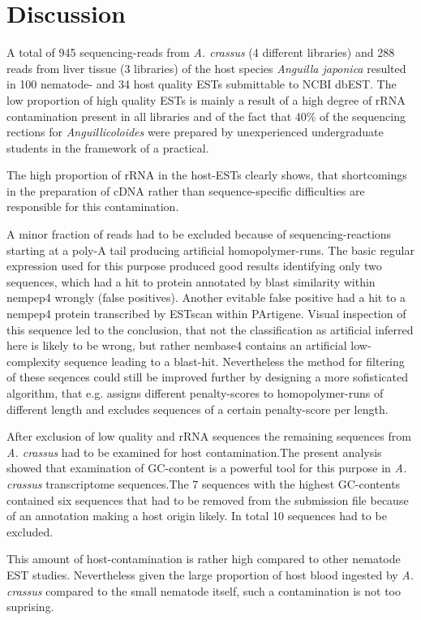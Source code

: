 \documentclass[12pt,a4paper]{article}
\begin{document}
\section*{Discussion}

A total of 945 sequencing-reads from
\textit{A. crassus} (4 different libraries) and
288 reads from liver tissue (3 libraries)
of the host species \textit{Anguilla japonica} resulted in
100 nematode- and
34 host quality ESTs submittable to NCBI
dbEST. The low proportion of high quality ESTs is mainly a result of a
high degree of rRNA contamination present in all libraries and of the
fact that 40\% of the sequencing rections for
\textit{Anguillicoloides} were prepared by unexperienced undergraduate
students in the framework of a practical.

The high proportion of rRNA in the host-ESTs clearly shows, that
shortcomings in the preparation of cDNA rather than sequence-specific
difficulties are responsible for this contamination.

A minor fraction of reads had to be excluded because of
sequencing-reactions starting at a poly-A tail producing artificial
homopolymer-runs. The basic regular expression used for this purpose
produced good results identifying only two sequences, which had a hit
to protein annotated by blast similarity within nempep4 wrongly (false
positives). Another evitable false positive had a hit to a nempep4
protein transcribed by ESTscan\cite{estscan} within PArtigene. Visual
inspection of this sequence led to the conclusion, that not the
classification as artificial inferred here is likely to be wrong, but
rather nembase4 contains an artificial low-complexity sequence leading
to a blast-hit. Nevertheless the method for filtering of these
seqences could still be improved further by designing a more
sofisticated algorithm, that e.g. assigns different penalty-scores to
homopolymer-runs of different length and excludes sequences of a
certain penalty-score per length.

After exclusion of low quality and rRNA sequences the remaining
sequences from \textit{A. crassus} had to be examined for host
contamination.The present analysis showed that examination of
GC-content is a powerful tool for this purpose in \textit{A. crassus}
transcriptome sequences.The 7 sequences with the highest GC-contents
contained six sequences that had to be removed from the submission
file because of an annotation making a host origin likely. In total 10
sequences had to be excluded.

This amount of host-contamination is rather high compared to other
nematode EST studies. Nevertheless given the large proportion of host
blood ingested by \textit{A. crassus} compared to the small nematode
itself, such a contamination is not too suprising.
\end{document}
